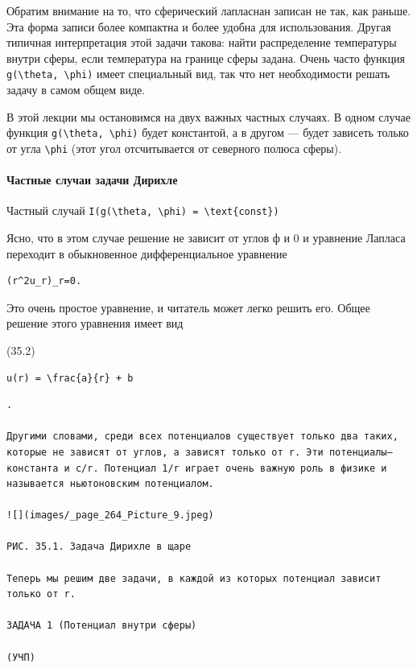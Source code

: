 \documentclass[
  ukrainian,
]{article}
\begin{document}
Обратим внимание на то, что сферический лапласнан записан не так, как
раньше. Эта форма записи более компактна и более удобна для
использования. Другая типичная интерпретация этой задачи такова: найти
распределение температуры внутри сферы, если температура на границе
сферы задана. Очень часто функция
\texttt{g(\textbackslash{}theta,\ \textbackslash{}phi)} имеет
специальный вид, так что нет необходимости решать задачу в самом общем
виде.

В этой лекции мы остановимся на двух важных частных случаях. В одном
случае функция \texttt{g(\textbackslash{}theta,\ \textbackslash{}phi)}
будет константой, а в другом --- будет зависеть только от угла
\texttt{\textbackslash{}phi} (этот угол отсчитывается от северного
полюса сферы).

\paragraph{Частные случаи задачи
Дирихле}\label{ux447ux430ux441ux442ux43dux44bux435-ux441ux43bux443ux447ux430ux438-ux437ux430ux434ux430ux447ux438-ux434ux438ux440ux438ux445ux43bux435}

Частный случай
\texttt{I(g(\textbackslash{}theta,\ \textbackslash{}phi)\ =\ \textbackslash{}text\{const\})}

Ясно, что в этом случае решение не зависит от углов ф и 0 и уравнение
Лапласа переходит в обыкновенное дифференциальное уравнение

\begin{verbatim}
(r^2u_r)_r=0.
\end{verbatim}

Это очень простое уравнение, и читатель может легко решить его. Общее
решение этого уравнения имеет вид

(35.2)

\begin{verbatim}
u(r) = \frac{a}{r} + b
\end{verbatim}

\begin{verbatim}
.

Другими словами, среди всех потенциалов существует только два таких, которые не зависят от углов, а зависят только от r. Эти потенциалы— константа и c/r. Потенциал 1/r играет очень важную роль в физике и называется ньютоновским потенциалом.

![](images/_page_264_Picture_9.jpeg)

РИС. 35.1. Задача Дирихле в щаре

Теперь мы решим две задачи, в каждой из которых потенциал зависит только от r.

ЗАДАЧА 1 (Потенциал внутри сферы)

(УЧП)
\end{verbatim}
\end{document}
